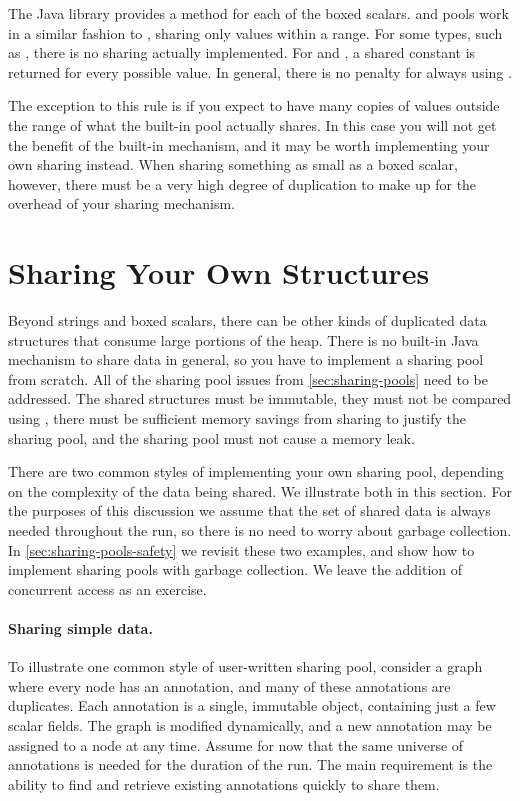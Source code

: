 The Java library provides a  method for each of the boxed
scalars.  and  pools work in a similar fashion
to , sharing only values within a range. For some types,
such as , there is no sharing actually implemented. For
 and , a shared constant is returned for every possible value. 
In general, there is no penalty for always using .

The exception to this rule is if you expect to have many copies
of values outside the range of what the built-in pool
actually shares. In this case you will not get the benefit of the built-in
mechanism, and it may be worth implementing your own sharing instead.  When
sharing something as small as a boxed scalar, however, there must be a very
high degree of duplication to make up for the overhead of your
sharing mechanism.

\section{Sharing Your Own Structures}
\label{sec:canonicalizing-maps}

Beyond strings and boxed scalars, there can be other kinds of
duplicated data structures that consume large portions of the heap. 
There is no built-in Java mechanism to share data
in general, so you have to implement a sharing pool from
scratch. All of the sharing pool issues from \autoref{sec:sharing-pools} need
to be addressed. The shared structures must be immutable, they must not be
compared using \code{==}, there must be sufficient memory savings from sharing
to justify the sharing pool, and the sharing pool must not cause a memory leak. 

There are two common styles of implementing your own sharing pool, depending on
the complexity of the data being shared.  We illustrate both in this section. 
For the purposes of this discussion we assume that the set of shared data is
always needed throughout the run, so there is no need to worry about garbage collection. In
\autoref{sec:sharing-pools-safety} we revisit these two examples, and show how
to implement sharing pools with garbage collection.  
We leave the addition of concurrent access as an exercise. 

\paragraph{Sharing simple data.} To illustrate one common style of
user-written sharing pool, consider a graph where every node has an
annotation, and many of these annotations are duplicates.
Each annotation is a single, immutable 
object, containing just a few scalar fields. The graph is modified
dynamically, and a new annotation may be assigned to a node at any
time. Assume for now that the same universe of annotations is needed for the
duration of the run.
The main requirement is the ability to find and
retrieve existing annotations quickly to share them.


